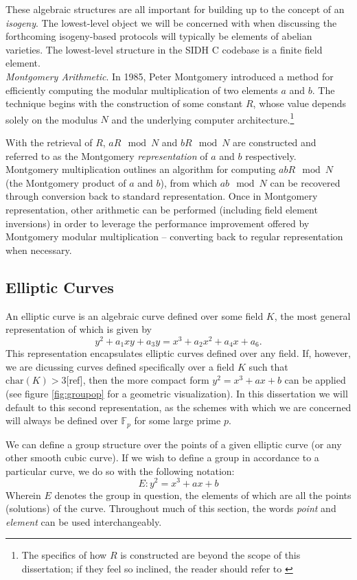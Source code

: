 These algebraic structures are all important for building up to the concept of an \emph{isogeny}. The lowest-level object we will be concerned with when discussing the forthcoming isogeny-based protocols will typically be elements of abelian varieties. The lowest-level structure in the SIDH C codebase is a finite field element.\\

\noindent
\emph{Montgomery Arithmetic}\label{snip:montgomery}. In 1985, Peter Montgomery introduced a method for efficiently computing the modular multiplication of two elements $a$ and $b$. The technique begins with the construction of some constant $R$, whose value depends solely on the modulus $N$ and the underlying computer architecture.\footnote{The specifics of how $R$ is constructed are beyond the scope of this dissertation; if they feel so inclined, the reader should refer to \cite{mont}}

With the retrieval of $R$, $aR \mod{N}$ and $bR \mod{N}$ are constructed and referred to as the Montgomery \emph{representation} of $a$ and $b$ respectively. Montgomery multiplication outlines an algorithm for computing $abR \mod{N}$ (the Montgomery product of $a$ and $b$), from which $ab \mod{N}$ can be recovered through conversion back to standard representation. Once in Montgomery representation, other arithmetic can be performed (including field element inversions) in order to leverage the performance improvement offered by Montgomery modular multiplication -- converting back to regular representation when necessary.

\subsection{Elliptic Curves}

An elliptic curve is an algebraic curve defined over some field $K$, the most general representation of which is given by
$$
y^2 + a_{1}xy + a_{3}y = x^3 + a_{2}x^2 + a_{4}x + a_6.
$$
This representation encapsulates elliptic curves defined over any field. If, however, we are dicussing curves defined specifically over a field $K$ such that $\text{char}(K) > 3$[ref], then the more compact form $y^2 = x^3 + ax + b$ can be applied (see figure \ref{fig:groupop} for a geometric visualization). In this dissertation we will default to this second representation, as the schemes with which we are concerned will always be defined over $\mathbb{F}_p$ for some large prime $p$.

We can define a group structure over the points of a given elliptic curve (or any other smooth cubic curve). If we wish to define a group in accordance to a particular curve, we do so with the following notation:
$$
E: y^2 = x^3 + ax + b
$$
Wherein $E$ denotes the group in question, the elements of which are all the points (solutions) of the curve. Throughout much of this section, the words \emph{point} and \emph{element} can be used interchangeably.\\

